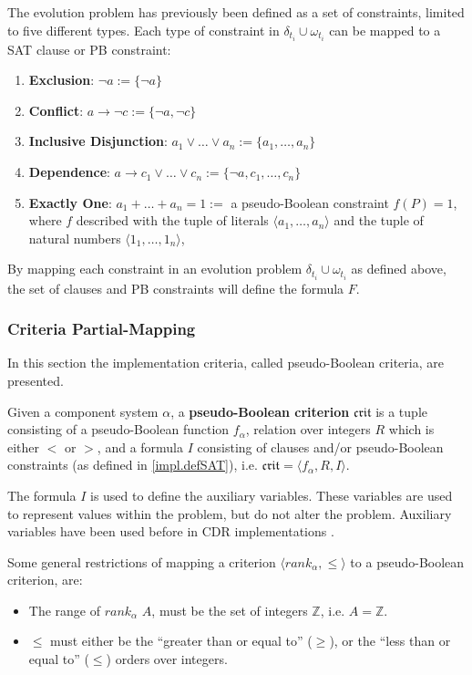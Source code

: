 The evolution problem has previously been defined as a set of constraints, limited to five different types.
Each type of constraint in $\delta_{t_i} \cup \omega_{t_i}$ can be mapped to a SAT clause or PB constraint:
\begin{enumerate}
  \item \textbf{Exclusion}: $\neg a := \{\neg a\}$
  \item \textbf{Conflict}: $a \rightarrow \neg c := \{\neg a, \neg c\}$ 
  \item \textbf{Inclusive Disjunction}: $a_1 \vee \ldots \vee a_n := \{a_1, \ldots,  a_n\}$ 
  \item \textbf{Dependence}: $a \rightarrow c_1 \vee \ldots \vee c_n := \{\neg a, c_1, \ldots, c_n\}$
  \item \textbf{Exactly One}: $a_1 + \ldots + a_n = 1 := $ a pseudo-Boolean constraint $f(P) = 1$, 
  where $f$ described with the tuple of literals $\langle a_1 ,\ldots , a_n\rangle$ and the tuple of natural numbers $\langle 1_1,\ldots,1_n \rangle$, %
\end{enumerate}
By mapping each constraint in an evolution problem $\delta_{t_i} \cup \omega_{t_i}$ as defined above, the set of clauses and PB constraints will define the formula $F$.

\subsubsection{Criteria Partial-Mapping}
In this section the implementation criteria, called pseudo-Boolean criteria, are presented.

\begin{defs}
Given a component system $\alpha$, a \textbf{pseudo-Boolean criterion} $\mathfrak{crit}$ is a tuple consisting of a pseudo-Boolean function $f_{\alpha}$,
relation over integers $R$ which is either $<$ or $>$, and a formula $I$ consisting of clauses and/or pseudo-Boolean constraints (as defined in \ref{impl.defSAT}),
i.e. $\mathfrak{crit} = \langle f_{\alpha}, R , I \rangle$.
\end{defs}
The formula $I$ is used to define the auxiliary variables.
These variables are used to represent values within the problem, but do not alter the problem.
Auxiliary variables have been used before in CDR implementations \citep{argelich2010solving}.

Some general restrictions of mapping a criterion $\langle rank_{\alpha},\leq \rangle$ to a pseudo-Boolean criterion, are:
\begin{itemize}
  \item The range of $rank_{\alpha}$ $A$, must be the set of integers $\mathbb{Z}$, i.e. $A = \mathbb{Z}$.
  \item $\leq$ must either be the ``greater than or equal to'' ($\geq$), or the ``less than or equal to'' ($\leq$) orders over integers.
\end{itemize} 

